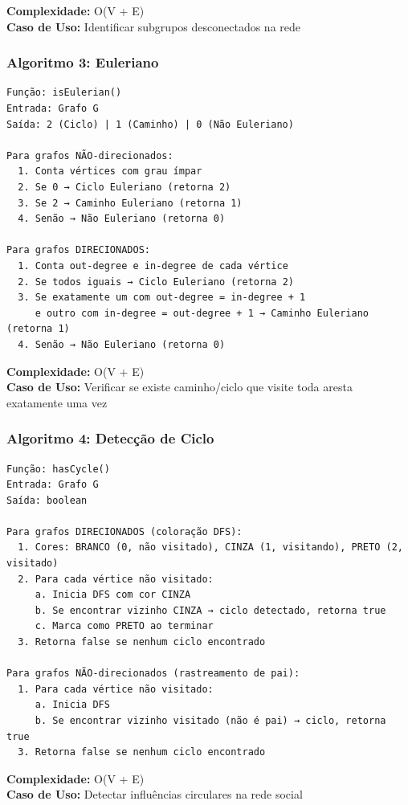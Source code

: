 \documentclass[12pt,a4paper]{article}
\begin{document}
\textbf{Complexidade:} O(V + E) \\
\textbf{Caso de Uso:} Identificar subgrupos desconectados na rede

\subsubsection{Algoritmo 3: Euleriano}

\begin{verbatim}
Função: isEulerian()
Entrada: Grafo G
Saída: 2 (Ciclo) | 1 (Caminho) | 0 (Não Euleriano)

Para grafos NÃO-direcionados:
  1. Conta vértices com grau ímpar
  2. Se 0 → Ciclo Euleriano (retorna 2)
  3. Se 2 → Caminho Euleriano (retorna 1)
  4. Senão → Não Euleriano (retorna 0)

Para grafos DIRECIONADOS:
  1. Conta out-degree e in-degree de cada vértice
  2. Se todos iguais → Ciclo Euleriano (retorna 2)
  3. Se exatamente um com out-degree = in-degree + 1
     e outro com in-degree = out-degree + 1 → Caminho Euleriano (retorna 1)
  4. Senão → Não Euleriano (retorna 0)
\end{verbatim}

\textbf{Complexidade:} O(V + E) \\
\textbf{Caso de Uso:} Verificar se existe caminho/ciclo que visite toda aresta exatamente uma vez

\subsubsection{Algoritmo 4: Detecção de Ciclo}

\begin{verbatim}
Função: hasCycle()
Entrada: Grafo G
Saída: boolean

Para grafos DIRECIONADOS (coloração DFS):
  1. Cores: BRANCO (0, não visitado), CINZA (1, visitando), PRETO (2, visitado)
  2. Para cada vértice não visitado:
     a. Inicia DFS com cor CINZA
     b. Se encontrar vizinho CINZA → ciclo detectado, retorna true
     c. Marca como PRETO ao terminar
  3. Retorna false se nenhum ciclo encontrado

Para grafos NÃO-direcionados (rastreamento de pai):
  1. Para cada vértice não visitado:
     a. Inicia DFS
     b. Se encontrar vizinho visitado (não é pai) → ciclo, retorna true
  3. Retorna false se nenhum ciclo encontrado
\end{verbatim}

\textbf{Complexidade:} O(V + E) \\
\textbf{Caso de Uso:} Detectar influências circulares na rede social
\end{document}
